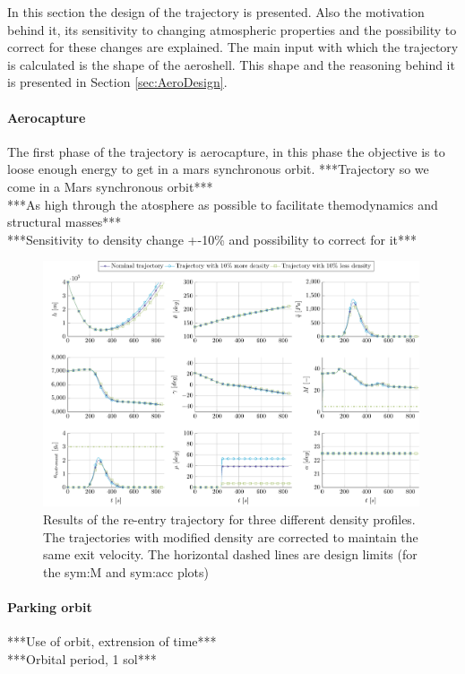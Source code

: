 In this section the design of the trajectory is presented. Also the motivation behind it, its sensitivity to changing atmospheric properties and the possibility to correct for these changes are explained. The main input with which the trajectory is calculated is the shape of the aeroshell. This shape and the reasoning behind it is presented in Section \ref{sec:AeroDesign}.

\paragraph{Aerocapture}
The first phase of the trajectory is aerocapture, in this phase the objective is to loose enough energy to get in a mars synchronous orbit. 
***Trajectory so we come in a Mars synchronous orbit***\\
***As high through the atosphere as possible to facilitate themodynamics and structural masses***\\

***Sensitivity to density change +-10\% and possibility to correct for it***\\
\begin{figure}
	\centering
	\includegraphics[width=0.99\textwidth]{Figure/Orbit/sensitivity_aerocapture.pdf}
	\caption{ Results of the re-entry trajectory for three different density profiles. The trajectories with modified density are corrected to maintain the same exit velocity. The horizontal dashed lines are design limits (for the \gls{sym:M} and \gls{sym:acc} plots) }
	\label{fig:orbit_aerocapture_data}
\end{figure}

\paragraph{Parking orbit}
***Use of orbit, extrension of time***\\
***Orbital period, 1 sol***\\

